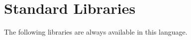 









\newpage

















\section{Standard Libraries}

The following libraries are always available in this language.








    
